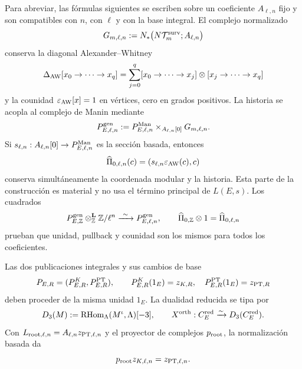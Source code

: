 Para abreviar, las fórmulas siguientes se escriben sobre un coeficiente
$A_{\ell,n}$ fijo y son compatibles con $n$, con $\ell$ y con la base
integral. El complejo normalizado
\begin{equation}\label{eq:pdf2-bsd-gmn}
 G_{m,\ell,n}:=N_*\bigl(N\mathcal T_m^{\rm surv};A_{\ell,n}\bigr)
\end{equation}
conserva la diagonal Alexander--Whitney
\begin{equation}\label{eq:pdf2-bsd-aw}
 \Delta_{\rm AW}[x_0\to\cdots\to x_q]
 =\sum_{j=0}^q[x_0\to\cdots\to x_j]\otimes
                [x_j\to\cdots\to x_q]
\end{equation}
y la counidad
$\varepsilon_{\rm AW}[x]=1$ en vértices, cero en grados positivos. La historia
se acopla al complejo de Manin mediante
\begin{equation}\label{eq:pdf2-bsd-pullback}
 P_{E,\ell,n}^{\rm gen}:=
 P_{E,\ell,n}^{\rm Man}\times_{A_{\ell,n}[0]}G_{m,\ell,n}.
\end{equation}
Si $s_{\ell,n}:A_{\ell,n}[0]\to P_{E,\ell,n}^{\rm Man}$ es la sección
basada, entonces
\[
 \widehat\Pi_{0,\ell,n}(c)=
 (s_{\ell,n}\varepsilon_{\rm AW}(c),c)
\]
conserva simultáneamente la coordenada modular y la historia. Esta parte de la
construcción es material y no usa el término principal de $L(E,s)$. Los
cuadrados
\begin{equation}\label{eq:pdf2-bsd-pullback-base-change}
 P_{E,\mathbb Z}^{\rm gen}\otimes_{\mathbb Z}^{\mathbf L}
      \mathbb Z/\ell^n
 \xrightarrow{\ \sim\ }P_{E,\ell,n}^{\rm gen},
 \qquad
 \widehat\Pi_{0,\mathbb Z}\otimes1=\widehat\Pi_{0,\ell,n}
\end{equation}
prueban que unidad, pullback y counidad son los mismos para todos los
coeficientes.

Las dos publicaciones integrales y sus cambios de base
\begin{equation}\label{eq:pdf2-bsd-copub}
 P_{E,R}=(P_{E,R}^K,P_{E,R}^{\rm PT}),
 \qquad P_{E,R}^K(1_E)=z_{K,R},\quad
 P_{E,R}^{\rm PT}(1_E)=z_{{\rm PT},R}
\end{equation}
deben proceder de la misma unidad $1_E$. La dualidad reducida se tipa por
\[
 D_3(M):=\operatorname{RHom}_\Lambda(M^\iota,\Lambda)[-3],
 \qquad
 X^{\rm orth}:C_E^{\rm red}\xrightarrow{\sim}D_3(C_E^{\rm red}).
\]
Con $L_{{\rm root},\ell,n}=A_{\ell,n}z_{{\rm PT},\ell,n}$ y el proyector de complejos
$p_{\rm root}$, la normalización basada da
\begin{equation}\label{eq:pdf2-bsd-raiz}
 p_{\rm root}z_{K,\ell,n}=z_{{\rm PT},\ell,n}.
\end{equation}

